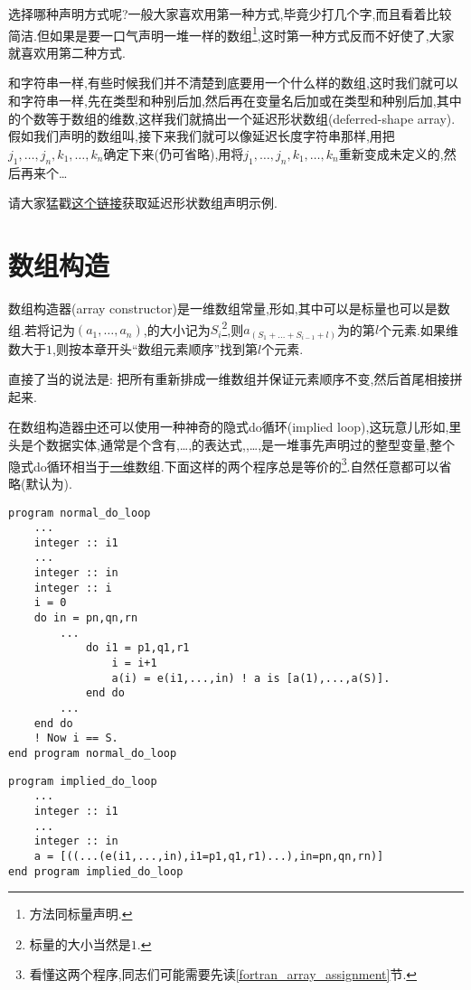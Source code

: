 选择哪种声明方式呢?一般大家喜欢用第一种方式,毕竟少打几个字,而且看着比较简洁.但如果是要一口气声明一堆一样的数组\footnote{
    方法同标量声明.
},这时第一种方式反而不好使了,大家就喜欢用第二种方式.

和字符串一样,有些时候我们并不清楚到底要用一个什么样的数组,这时我们就可以和字符串一样,先在类型和种别后加,然后再在变量名后加或在类型和种别后加,其中\ttt{:}的个数等于数组的维数,这样我们就搞出一个延迟形状数组(deferred-shape array).假如我们声明的数组叫,接下来我们就可以像延迟长度字符串那样,用把$j_1,\dots,j_n,k_1,\dots,k_n$确定下来(仍可省略),用将$j_1,\dots,j_n,k_1,\dots,k_n$重新变成未定义的,然后再来个\dots

请大家猛戳\href{https://fortran-lang.org/learn/quickstart/arrays_strings#allocatable-dynamic-arrays}{这个链接}获取延迟形状数组声明示例.

\section{数组构造}

数组构造器(array constructor)是一维数组常量,形如\ttt{[e1,...,em]},其中可以是标量也可以是数组.若将\ttt{[e1,...,em]}记为$(a_1,\dots,a_n)$,的大小记为$S_i$\footnote{
    标量的大小当然是$1$.
},则$a_{(S_1+\dots+S_{i-1}+l)}$为的第$l$个元素.如果维数大于$1$,则按本章开头``数组元素顺序''找到第$l$个元素.

直接了当的说法是: 把所有重新排成一维数组并保证元素顺序不变,然后首尾相接拼起来.

在数组构造器\uline{中}还可以使用一种神奇的隐式do循环(implied  loop),这玩意儿形如,里头是个数据实体,通常是个含有,\dots,的表达式,,\dots,是一堆事先声明过的整型变量,整个隐式do循环相当于\uline{一维}数组.下面这样的两个程序总是等价的\footnote{
看懂这两个程序,同志们可能需要先读\ref{fortran_array_assignment}节.
}.自然任意都可以省略(默认为).
\begin{lstlisting}
program normal_do_loop
    ...
    integer :: i1
    ...
    integer :: in
    integer :: i
    i = 0
    do in = pn,qn,rn
        ...
            do i1 = p1,q1,r1
                i = i+1
                a(i) = e(i1,...,in) ! a is [a(1),...,a(S)].
            end do
        ...
    end do
    ! Now i == S.
end program normal_do_loop
\end{lstlisting}
\begin{lstlisting}
program implied_do_loop
    ...
    integer :: i1
    ...
    integer :: in
    a = [((...(e(i1,...,in),i1=p1,q1,r1)...),in=pn,qn,rn)]
end program implied_do_loop
\end{lstlisting}


